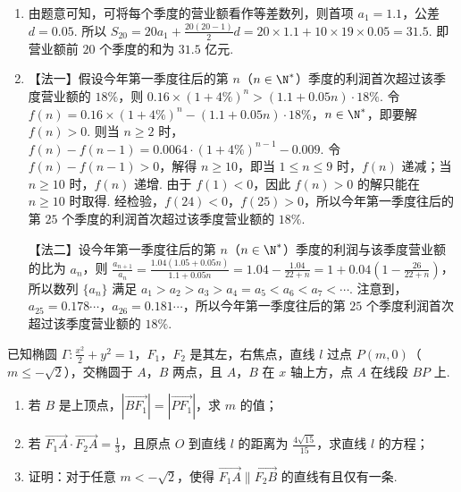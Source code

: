 \begin{solution}
\begin{enumerate}
\item 由题意可知，可将每个季度的营业额看作等差数列，则首项 \(a_1=1.1\)，公差 \(d=0.05\). 所以 \(S_{20}=20a_1+\frac{20\left( 20-1 \right)}{2}d=20\times 1.1+10\times 19\times 0.05=31.5\). 即营业额前 \(20\) 个季度的和为 \(31.5\) 亿元.

\item 【法一】假设今年第一季度往后的第 \(n\)（\(n\in \N^*\)）季度的利润首次超过该季度营业额的 \(18\%\)，则 \(0.16\times \left( 1+4\% \right)^n>\left( 1.1+0.05n \right)\cdot 18\%\). 令 \(f(n)=0.16\times \left( 1+4\% \right)^n-\left( 1.1+0.05n \right)\cdot 18\%\)，\(n\in \N^*\)，即要解 \(f(n)>0\). 则当 \(n\ge 2\) 时，\(f(n)-f(n-1)=0.0064\cdot \left( 1+4\% \right)^{n-1}-0.009\). 令 \(f(n)-f(n-1)>0\)，解得 \(n\ge 10\)，即当 \(1\le n\le 9\) 时，\(f(n)\) 递减；当 \(n\ge 10\) 时，\(f(n)\) 递增. 由于 \(f(1)<0\)，因此 \(f(n)>0\) 的解只能在 \(n\ge 10\) 时取得. 经检验，\(f(24)<0\)，\(f(25)>0\)，所以今年第一季度往后的第 \(25\) 个季度的利润首次超过该季度营业额的 \(18\%\).

【法二】设今年第一季度往后的第 \(n\)（\(n\in \N^*\)）季度的利润与该季度营业额的比为 \(a_n\)，则 \(\frac{a_{n+1}}{a_n}=\frac{1.04\left( 1.05+0.05n \right)}{1.1+0.05n}=1.04-\frac{1.04}{22+n}=1+0.04\left( 1-\frac{26}{22+n} \right)\)，所以数列 \(\{a_n\}\) 满足 \(a_1>a_2>a_3>a_4=a_5<a_6<a_7<\cdots\). 注意到，\(a_{25}=0.178\cdots\)，\(a_{26}=0.181\cdots\)，所以今年第一季度往后的第 \(25\) 个季度利润首次超过该季度营业额的 \(18\%\).
\end{enumerate}
\end{solution}

\begin{problem}
已知椭圆 \(\Gamma:\frac{x^2}{2}+y^2=1\)，\(F_1\)，\(F_2\) 是其左，右焦点，直线 \(l\) 过点 \(P(m,0)\)（\(m\le -\sqrt2\)），交椭圆于 \(A\)，\(B\) 两点，且 \(A\)，\(B\) 在 \(x\) 轴上方，点 \(A\) 在线段 \(BP\) 上.

\begin{enumerate}
\item 若 \(B\) 是上顶点，\(\left| \overrightarrow{BF_1} \right|=\left| \overrightarrow{PF_1} \right|\)，求 \(m\) 的值；
\item 若 \(\overrightarrow{F_1A}\cdot \overrightarrow{F_2A}=\frac13\)，且原点 \(O\) 到直线 \(l\) 的距离为 \(\frac{4\sqrt{15}}{15}\)，求直线 \(l\) 的方程；
\item 证明：对于任意 \(m<-\sqrt2\)，使得 \(\overrightarrow{F_1A}\parallel \overrightarrow{F_2B}\) 的直线有且仅有一条.
\end{enumerate}
\end{problem}

